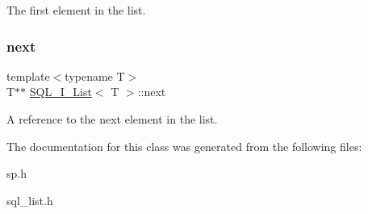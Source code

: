 The first element in the list. \mbox{\label{classSQL__I__List_a73dfc554232c8d15637767d2c61b7578}} 
\subsubsection{\texorpdfstring{next}{next}}
{\footnotesize\ttfamily template$<$typename T$>$ \\
T$\ast$$\ast$ \mbox{\hyperlink{classSQL__I__List}{S\+Q\+L\+\_\+\+I\+\_\+\+List}}$<$ T $>$\+::next}

A reference to the next element in the list. 

The documentation for this class was generated from the following files\+:\begin{DoxyCompactItemize}
\item 
sp.\+h\item 
sql\+\_\+list.\+h\end{DoxyCompactItemize}
